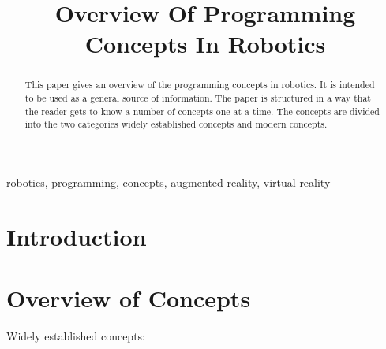 \documentclass[conference]{IEEEtran}
\begin{document}
\title{Overview Of Programming Concepts In Robotics\\}

\author{

    \and
}

\maketitle

\begin{abstract}
    This paper gives an overview of the programming concepts in robotics. It is intended to be used as a general source of information. The paper is structured in a way that the reader gets to know a number of concepts one at a time. The concepts are divided into the two categories widely established concepts and modern concepts.
\end{abstract}

\begin{IEEEkeywords}
    robotics, programming, concepts, augmented reality, virtual reality 
\end{IEEEkeywords}

\section{Introduction}
  
\section{Overview of Concepts}

Widely established concepts:
\end{document}
